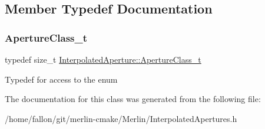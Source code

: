 \subsection{Member Typedef Documentation}
\mbox{\label{classInterpolatedAperture_a39433c0172ff3f57ea3daefaff6fcc74}} 
\subsubsection{\texorpdfstring{Aperture\+Class\+\_\+t}{ApertureClass\_t}}
{\footnotesize\ttfamily typedef size\+\_\+t \hyperlink{classInterpolatedAperture_a39433c0172ff3f57ea3daefaff6fcc74}{Interpolated\+Aperture\+::\+Aperture\+Class\+\_\+t}}

Typedef for access to the enum 

The documentation for this class was generated from the following file\+:\begin{DoxyCompactItemize}
\item 
/home/fallon/git/merlin-\/cmake/\+Merlin/Interpolated\+Apertures.\+h\end{DoxyCompactItemize}
